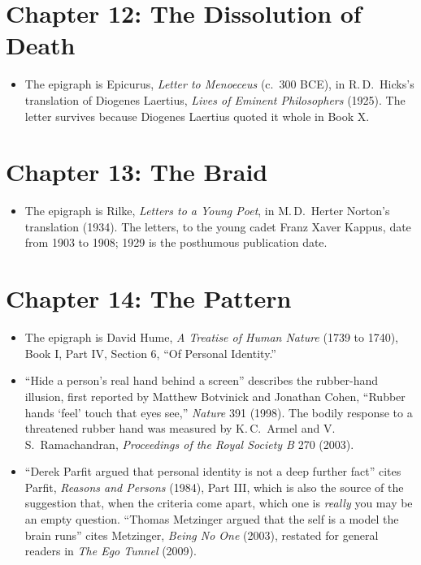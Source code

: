 \section*{Chapter 12: The Dissolution of Death}

\begin{itemize}
\setlength{\itemsep}{0.5em}
\item The epigraph is Epicurus, \textit{Letter to Menoeceus} (c.\ 300 BCE), in R.\,D.\ Hicks's translation of Diogenes Laertius, \textit{Lives of Eminent Philosophers} (1925). The letter survives because Diogenes Laertius quoted it whole in Book X.
\end{itemize}

\section*{Chapter 13: The Braid}

\begin{itemize}
\setlength{\itemsep}{0.5em}
\item The epigraph is Rilke, \textit{Letters to a Young Poet}, in M.\,D.\ Herter Norton's translation (1934). The letters, to the young cadet Franz Xaver Kappus, date from 1903 to 1908; 1929 is the posthumous publication date.
\end{itemize}

\section*{Chapter 14: The Pattern}

\begin{itemize}
\setlength{\itemsep}{0.5em}
\item The epigraph is David Hume, \textit{A Treatise of Human Nature} (1739 to 1740), Book I, Part IV, Section 6, ``Of Personal Identity.''
\item ``Hide a person's real hand behind a screen'' describes the rubber-hand illusion, first reported by Matthew Botvinick and Jonathan Cohen, ``Rubber hands `feel' touch that eyes see,'' \textit{Nature} 391 (1998). The bodily response to a threatened rubber hand was measured by K.\,C.\ Armel and V.\,S.\ Ramachandran, \textit{Proceedings of the Royal Society B} 270 (2003).
\item ``Derek Parfit argued that personal identity is not a deep further fact'' cites Parfit, \textit{Reasons and Persons} (1984), Part III, which is also the source of the suggestion that, when the criteria come apart, which one is \emph{really} you may be an empty question. ``Thomas Metzinger argued that the self is a model the brain runs'' cites Metzinger, \textit{Being No One} (2003), restated for general readers in \textit{The Ego Tunnel} (2009).
\end{itemize}

